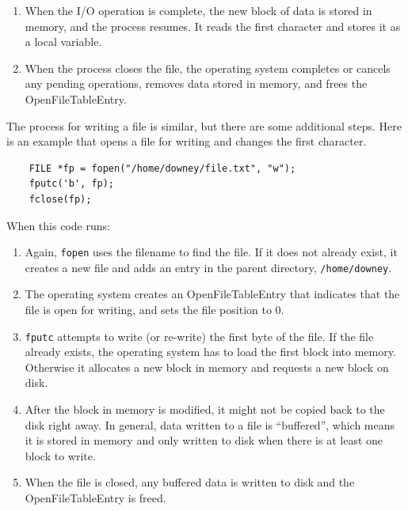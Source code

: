 \documentclass[12pt]{book}
\begin{document}
{\begin{enumerate}
\item When the I/O operation is complete, the new block of data is
  stored in memory, and the process resumes.  It reads the first
  character and stores it as a local variable.

\item When the process closes the file, the operating system completes
  or cancels any pending operations, removes data stored in
  memory, and frees the OpenFileTableEntry.

\end{enumerate}

The process for writing a file is similar, but there are some
additional steps.  Here is an example that opens a file for
writing and changes the first character.

\begin{verbatim}
    FILE *fp = fopen("/home/downey/file.txt", "w");
    fputc('b', fp);
    fclose(fp);
\end{verbatim}

When this code runs:

\begin{enumerate}

\item Again, {\tt fopen} uses the filename to find the file.  If it
  does not already exist, it creates a new file and adds an entry in
  the parent directory, {\tt /home/downey}.

\item The operating system creates an OpenFileTableEntry that
  indicates that the file is open for writing, and sets the file
  position to 0.

\item {\tt fputc} attempts to write (or re-write) the first byte of
  the file.  If the file already exists, the operating system has to
  load the first block into memory.  Otherwise it allocates a new
  block in memory and requests a new block on disk.

\item After the block in memory is modified, it might not be copied
  back to the disk right away.  In general, data written to a file is
  ``buffered'', which means it is stored in memory and only written to
  disk when there is at least one block to write.

\item When the file is closed, any buffered data is written to disk
  and the OpenFileTableEntry is freed.

\end{enumerate}

}
\end{document}
